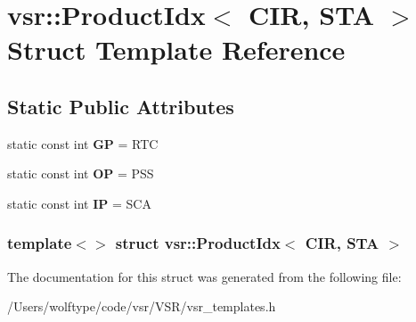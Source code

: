 \hypertarget{structvsr_1_1_product_idx_3_01_c_i_r_00_01_s_t_a_01_4}{\section{vsr\-:\-:Product\-Idx$<$ C\-I\-R, S\-T\-A $>$ Struct Template Reference}
\label{structvsr_1_1_product_idx_3_01_c_i_r_00_01_s_t_a_01_4}
}
\subsection*{Static Public Attributes}
\begin{DoxyCompactItemize}
\item 
\hypertarget{structvsr_1_1_product_idx_3_01_c_i_r_00_01_s_t_a_01_4_a72e0e49406eff5ec04e49c5cddaf9414}{static const int {\bfseries G\-P} = R\-T\-C}\label{structvsr_1_1_product_idx_3_01_c_i_r_00_01_s_t_a_01_4_a72e0e49406eff5ec04e49c5cddaf9414}

\item 
\hypertarget{structvsr_1_1_product_idx_3_01_c_i_r_00_01_s_t_a_01_4_abc375322a1ffd9b1306200500da6dcce}{static const int {\bfseries O\-P} = P\-S\-S}\label{structvsr_1_1_product_idx_3_01_c_i_r_00_01_s_t_a_01_4_abc375322a1ffd9b1306200500da6dcce}

\item 
\hypertarget{structvsr_1_1_product_idx_3_01_c_i_r_00_01_s_t_a_01_4_a504e40888827e78538796029a6298784}{static const int {\bfseries I\-P} = S\-C\-A}\label{structvsr_1_1_product_idx_3_01_c_i_r_00_01_s_t_a_01_4_a504e40888827e78538796029a6298784}

\end{DoxyCompactItemize}
\subsubsection*{template$<$$>$ struct vsr\-::\-Product\-Idx$<$ C\-I\-R, S\-T\-A $>$}



The documentation for this struct was generated from the following file\-:\begin{DoxyCompactItemize}
\item 
/\-Users/wolftype/code/vsr/\-V\-S\-R/vsr\-\_\-templates.\-h\end{DoxyCompactItemize}

